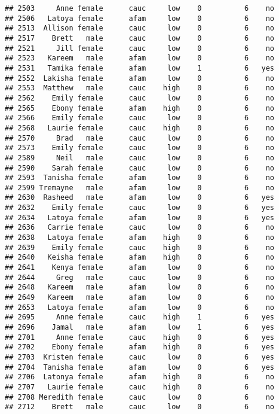 \documentclass[
]{article}
\begin{document}
\begin{verbatim}
## 2503     Anne female      cauc     low    0          6    no
## 2506   Latoya female      afam     low    0          6    no
## 2513  Allison female      cauc     low    0          6    no
## 2517    Brett   male      cauc     low    0          6    no
## 2521     Jill female      cauc     low    0          6    no
## 2523   Kareem   male      afam     low    0          6    no
## 2531   Tamika female      afam     low    1          6   yes
## 2552  Lakisha female      afam     low    0          6    no
## 2553  Matthew   male      cauc    high    0          6    no
## 2562    Emily female      cauc     low    0          6    no
## 2565    Ebony female      afam    high    0          6    no
## 2566    Emily female      cauc     low    0          6    no
## 2568   Laurie female      cauc    high    0          6    no
## 2570     Brad   male      cauc     low    0          6    no
## 2573    Emily female      cauc     low    0          6    no
## 2589     Neil   male      cauc     low    0          6    no
## 2590    Sarah female      cauc     low    0          6    no
## 2593  Tanisha female      afam     low    0          6    no
## 2599 Tremayne   male      afam     low    0          6    no
## 2630  Rasheed   male      afam     low    0          6   yes
## 2632    Emily female      cauc     low    0          6   yes
## 2634   Latoya female      afam     low    0          6   yes
## 2636   Carrie female      cauc     low    0          6    no
## 2638   Latoya female      afam    high    0          6    no
## 2639    Emily female      cauc    high    0          6    no
## 2640   Keisha female      afam    high    0          6    no
## 2641    Kenya female      afam     low    0          6    no
## 2644     Greg   male      cauc     low    0          6    no
## 2648   Kareem   male      afam     low    0          6    no
## 2649   Kareem   male      afam     low    0          6    no
## 2653   Latoya female      afam     low    0          6    no
## 2695     Anne female      cauc    high    1          6   yes
## 2696    Jamal   male      afam     low    1          6   yes
## 2701     Anne female      cauc    high    0          6   yes
## 2702    Ebony female      afam    high    0          6   yes
## 2703  Kristen female      cauc     low    0          6   yes
## 2704  Tanisha female      afam     low    0          6   yes
## 2706  Latonya female      afam    high    0          6    no
## 2707   Laurie female      cauc    high    0          6    no
## 2708 Meredith female      cauc     low    0          6    no
## 2712    Brett   male      cauc     low    0          6    no

\end{verbatim}
\end{document}
